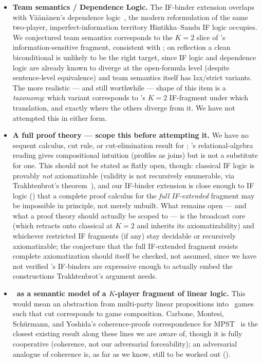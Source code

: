 \begin{itemize}
  \item \textbf{Team semantics / Dependence Logic.} The IF-binder extension
  overlaps with Väänänen's dependence logic~\cite{Vaananen2007DependenceLogic},
  the modern reformulation of the same two-player, imperfect-information
  territory Hintikka--Sandu IF logic occupies. We conjectured team semantics
  corresponds to the $K=2$ slice of \KFOL's information-sensitive fragment,
  consistent with ; on reflection a clean
  biconditional is unlikely to be the right target, since IF logic and
  dependence logic are already known to diverge at the open-formula level
  (despite sentence-level equivalence) and team semantics itself has
  lax/strict variants. The more realistic --- and still worthwhile --- shape
  of this item is a \emph{taxonomy}: which variant corresponds to \KFOL's
  $K=2$ IF-fragment under which translation, and exactly where the others
  diverge from it. We have not attempted this in either form.

  \item \textbf{A full proof theory --- scope this before attempting it.} We
  have no sequent calculus, cut rule, or cut-elimination result for \KFOL;
  's relational-algebra reading gives compositional
  intuition (profiles as joins) but is not a substitute for one. This should
  not be stated as flatly open, though: classical IF logic is provably
  \emph{not} axiomatizable (validity is not recursively enumerable, via
  Trakhtenbrot's theorem~\cite{Trakhtenbrot1950,sep-logic-if}), and our
  IF-binder extension is close enough to IF logic
  () that a complete proof calculus for
  the \emph{full IF-extended} fragment may be impossible in principle, not
  merely unbuilt. What remains open --- and what a proof theory should
  actually be scoped to --- is the broadcast core (which retracts onto
  classical \FOL at $K=2$ and inherits its axiomatizability) and whichever
  restricted IF fragments (if any) stay decidable or recursively
  axiomatizable; the conjecture that the full IF-extended fragment resists
  complete axiomatization should itself be checked, not assumed, since we
  have not verified \KFOL's IF-binders are expressive enough to actually
  embed the constructions Trakhtenbrot's argument needs.

  \item \textbf{\KFOL\ as a semantic model of a $K$-player fragment of linear
  logic.} This would mean an abstraction from multi-party linear propositions
  into \KFOL\ games such that cut corresponds to game composition. Carbone,
  Montesi, Sch\"urmann, and Yoshida's coherence-proofs correspondence for
  MPST~\cite{CarboneMontesiSchurmannYoshida2015Coherence} is the closest
  existing result along these lines we are aware of, though it is fully
  cooperative (coherence, not our adversarial forceability); an adversarial
  analogue of coherence is, as far as we know, still to be worked out
  ().


\end{itemize}
